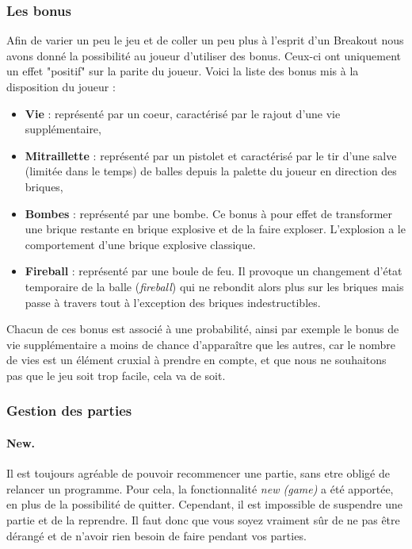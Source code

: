 \documentclass[a4paper,10pt]{article}
\begin{document}
    \subsubsection{Les bonus}
        Afin de varier un peu le jeu et de coller un peu plus à l'esprit d'un Breakout nous avons donné la possibilité au joueur
        d'utiliser des bonus. Ceux-ci ont uniquement un effet "positif" sur la parite du joueur. Voici la liste des bonus mis
        à la disposition du joueur :
        \begin{itemize}
            \item \textbf{Vie} : représenté par un coeur, caractérisé par le rajout d'une vie supplémentaire,
            \item \textbf{Mitraillette} : représenté par un pistolet et caractérisé par le tir d'une salve (limitée dans le temps)
            de balles depuis la palette du joueur en direction des briques,
            \item \textbf{Bombes} : représenté par une bombe. Ce bonus à pour effet de transformer une brique restante
            en brique explosive et de la faire exploser. L'explosion a le comportement d'une brique explosive classique.
            \item \textbf{Fireball} : représenté par une boule de feu. Il provoque un changement d'état temporaire de la balle (\textit{fireball})
            qui ne 	rebondit alors plus sur les briques mais passe à travers tout à l'exception des briques indestructibles.
        \end{itemize}

        Chacun de ces bonus est associé à une probabilité, ainsi  par exemple le bonus de vie supplémentaire a moins
        de chance d'apparaître que les autres, car le nombre de vies est un élément cruxial à prendre
        en compte, et que nous ne souhaitons pas que le jeu soit trop facile, cela va de soit.

    \subsubsection{Gestion des parties}
       
       	\paragraph{New.} Il est toujours agréable de pouvoir recommencer une partie, sans etre obligé de relancer un
        programme. Pour cela, la fonctionnalité \textit{new (game)} a été apportée, en plus de la
        possibilité de quitter. Cependant, il est impossible de suspendre une partie et de la reprendre.
        Il faut donc que vous soyez vraiment sûr de ne pas être dérangé et de n'avoir rien besoin de faire pendant vos parties. \\
\end{document}
